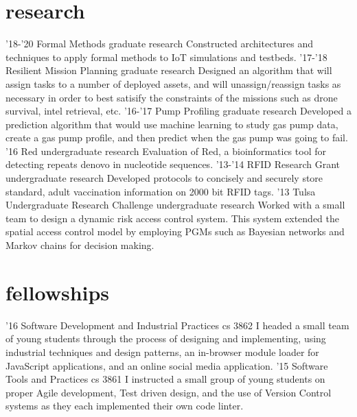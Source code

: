 \documentclass[print]{friggeri-cv}
\begin{document}
  \pagebreak
  \section{research}

    \begin{entrylist}
      \entry
        {'18-'20}
        {Formal Methods}
        {graduate research}
        {Constructed architectures and techniques to apply formal methods to IoT simulations and testbeds.}
      \entry
        {'17-'18}
        {Resilient Mission Planning}
        {graduate research}
        {Designed an algorithm that will assign tasks to a number of deployed assets, and will unassign/reassign tasks as necessary in order to best satisify the constraints of the missions such as drone survival, intel retrieval, etc.}
      \entry
        {'16-'17}
        {Pump Profiling}
        {graduate research}
        {Developed a prediction algorithm that would use machine learning to study gas pump data, create a gas pump profile, and then predict when the gas pump was going to fail.}
      \entry
        {'16}
        {Red}
        {undergraduate research}
        {Evaluation of Red, a bioinformatics tool for detecting repeats denovo in nucleotide sequences.}
      \entry
        {'13-'14}
        {RFID Research Grant}
        {undergraduate research}
        {Developed protocols to concisely and securely store standard, adult vaccination information on 2000 bit RFID tags.}
      \entry
        {'13}
        {Tulsa Undergraduate Research Challenge}
        {undergraduate research}
        {Worked with a small team to design a dynamic risk access control system. This system extended the spatial access control model by employing PGMs such as Bayesian networks and Markov chains for decision making.}
    \end{entrylist}

  \section{fellowships}

    \begin{entrylist}
      \entry
        {'16}
        {Software Development and Industrial Practices}
        {cs 3862}
        {I headed a small team of young students through the process of designing and implementing, using industrial techniques and design patterns, an in-browser module loader for JavaScript applications, and an online social media application.}
      \entry
        {'15}
        {Software Tools and Practices}
        {cs 3861}
        {I instructed a small group of young students on proper Agile development, Test driven design, and the use of Version Control systems as they each implemented their own code linter.}
    \end{entrylist}
\end{document}
